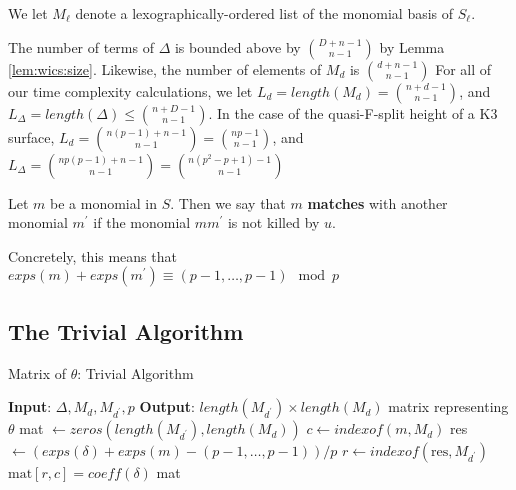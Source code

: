 We let \(M_{\ell}\) denote a lexographically-ordered list
of the monomial basis of \(S_{\ell}\).

\begin{rmk}
    The number of terms of \(\Delta\) is bounded 
    above by \(\binom{D+n-1}{n-1}\) by Lemma \ref{lem:wics:size}.
    Likewise, the number of elements of 
    \(M_{d}\) is \(\binom{d+n-1}{n-1}\)
    For all of our time complexity calculations, 
    we let $L_{d} = length(M_{d}) = \binom{n + d - 1}{n - 1}$, and $L_{\Delta} = length(\Delta) \leq \binom{n + D - 1}{n - 1}$.
    In the case of the quasi-F-split height of a K3 surface, 
    $L_{d} = \binom{n(p - 1) + n - 1}{n - 1} = \binom{np - 1}{n - 1}$, 
    and $L_{\Delta} = \binom{np(p - 1) + n - 1}{n - 1} = \binom{n(p^2 - p + 1) - 1}{n - 1}$
\end{rmk}


\begin{defn}
	Let \(m\) be a monomial in \(S\). 
	Then we say that \(m\) \textbf{matches}
	with another monomial \(m^{\prime}\) 
	if the monomial \(mm^{\prime}\) is
	not killed by \(u\).
\end{defn}

Concretely, this means that $exps(m) + exps(m^{\prime}) \equiv (p - 1, \dots, p - 1) \mod p$


\subsection{The Trivial Algorithm}

\begin{algorithm}[H]
    \caption{Matrix of $\theta$: Trivial Algorithm}
    \label{alg:matrix:trivial}
    \begin{algorithmic}[1]
    \State \textbf{Input}: $\Delta, M_{d}, M_{d^{\prime}}, p$
    \State \textbf{Output}: $length(M_{d^{\prime}}) \times length(M_{d})$ 
	matrix representing $\theta$
    \State mat $\gets zeros(length(M_{d^{\prime}}), length(M_{d}))$
	    \State $c \gets indexof(m, M _{d})$
        \For{$\delta \in \Delta$}
             
			\State res $\gets (exps(\delta) + exps(m) - (p-1, \ldots, p-1)) / p$ 
				\State $r \gets indexof(\text{res},M_{d^{\prime}})$
                \State $\text{mat}[r, c] = coeff(\delta)$
            \EndIf
        \EndFor
    \EndFor
    \State \Return mat
    \end{algorithmic}
\end{algorithm}

